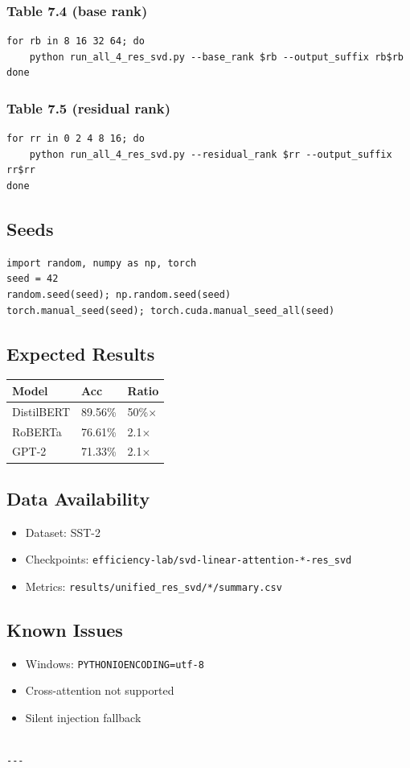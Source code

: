 \subsubsection{Table 7.4 (base rank)}
\begin{lstlisting}
for rb in 8 16 32 64; do
    python run_all_4_res_svd.py --base_rank $rb --output_suffix rb$rb
done
\end{lstlisting}

\subsubsection{Table 7.5 (residual rank)}
\begin{lstlisting}
for rr in 0 2 4 8 16; do
    python run_all_4_res_svd.py --residual_rank $rr --output_suffix rr$rr
done
\end{lstlisting}

\subsection{Seeds}

\begin{lstlisting}
import random, numpy as np, torch
seed = 42
random.seed(seed); np.random.seed(seed)
torch.manual_seed(seed); torch.cuda.manual_seed_all(seed)
\end{lstlisting}

\subsection{Expected Results}

\begin{table}[H]
\centering
\small
\begin{tabular}{lll}
\toprule
\textbf{Model} & \textbf{Acc} & \textbf{Ratio} \\
\midrule
DistilBERT & 89.56\% & 50\%$\times$ \\
RoBERTa & 76.61\% & 2.1$\times$ \\
GPT-2 & 71.33\% & 2.1$\times$ \\
\bottomrule
\end{tabular}
\end{table}

\subsection{Data Availability}

\begin{itemize}
\item Dataset: SST-2
\item Checkpoints: \texttt{efficiency-lab/svd-linear-attention-*-res\_svd}
\item Metrics: \texttt{results/unified\_res\_svd/*/summary.csv}

\end{itemize}
\subsection{Known Issues}

\begin{itemize}
\item Windows: \texttt{PYTHONIOENCODING=utf-8}
\item Cross-attention not supported
\item Silent injection fallback
\end{itemize}
\begin{lstlisting}

---
\end{lstlisting}
